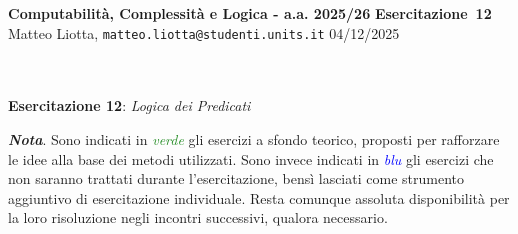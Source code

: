 \documentclass[a4paper,10pt]{article}
\makeatletter
\newcommand{\EsercitazioneNum}{12}
\newcommand{\Data}{04/12/2025}
\newcommand{\DocType}{Esercitazione} %
\newcommand{\FullTitle}{\DocType\ \EsercitazioneNum}
\newcommand{\Header}{
\noindent
  \small \textbf{Computabilità, Complessità e Logica - a.a. 2025/26} \hfill \textbf{\FullTitle} \\[0.2cm]
  \scriptsize Matteo Liotta, \texttt{matteo.liotta@studenti.units.it} \hfill \Data \\[0.2cm]
  \noindent\makebox[\linewidth]{\rule{\linewidth}{0.4pt}} \\[0.3cm]}
\makeatother
\begin{document}
\footnotesize  %
\Header\\[0.7cm]



    
    
    \noindent\Large \textbf{Esercitazione 12}: \textit{Logica dei Predicati} 
    \begin{osservazioni}
        \textbf{\textit{Nota}}. Sono indicati in \textcolor{ForestGreen}{\textit{verde}} gli esercizi a sfondo teorico, proposti per rafforzare le idee alla base dei metodi utilizzati. Sono invece indicati in \textcolor{blue}{\textit{blu}} gli esercizi che non saranno trattati durante l'esercitazione, bensì lasciati come strumento aggiuntivo di esercitazione individuale. Resta comunque assoluta disponibilità per la loro risoluzione negli incontri successivi, qualora necessario. 
    \end{osservazioni}
    
\end{document}
